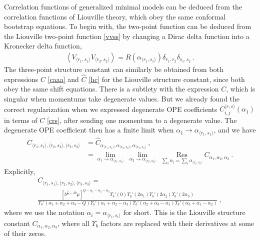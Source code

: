 \documentclass[12pt, a4paper, notitlepage, twoside]{report}
\numberwithin{equation}{section}
\theoremstyle{break}
\begin{document}
Correlation functions of generalized minimal models can be deduced from the correlation functions of Liouville theory, which obey the same conformal bootstrap equations.
To begin with, the two-point function can be deduced from the Liouville two-point function \eqref{vvss} by changing a Dirac delta function into a Kronecker delta function, 
\begin{align}
 \boxed{\left\langle V_{\langle r_1,s_1 \rangle} V_{\langle r_2,s_2 \rangle} \right\rangle = R(\alpha_{\langle r_1,s_1 \rangle}) \delta_{r_1,r_2} \delta_{s_1,s_2}}\ .
\label{vvdd}
\end{align}
The three-point structure constant can similarly be obtained from both expressions $C$ \eqref{caaa} and $\hat C$ \eqref{hc} for the Liouville structure constant, since both obey the same shift equations. 
There is a subtlety with the expression $C$, which is singular when momentums take degenerate values. 
But we already found the correct regularization when we expressed degenerate OPE coefficients $C_{i,j}^{\langle r,s \rangle}(\alpha_1)$ in terms of $C$ \eqref{crs}, after sending one momentum to a degenerate value. 
The degenerate OPE coefficient then has a finite limit when $\alpha_1\to \alpha_{\langle r_1,s_1 \rangle}$, and we have
\begin{align}
 C_{\langle r_1,s_1\rangle ,\langle r_2,s_2\rangle ,\langle r_3,s_3 \rangle} 
 &= \hat{C}_{\alpha_{\langle r_1,s_1 \rangle}, \alpha_{\langle r_2,s_2 \rangle} ,\alpha_{\langle r_3,s_3 \rangle} } \ ,
 \nonumber
 \\
& = \underset{\alpha_1\to \alpha_{\langle r_1,s_1 \rangle}}{\lim}\ 
\underset{\alpha_2\to \alpha_{\langle r_2,s_2 \rangle}}{\lim}\ 
\underset{\sum_i \alpha_i = \sum_i \alpha_{\langle r_i,s_i \rangle} }{\operatorname{ Res}} C_{\alpha_1,\alpha_2,\alpha_3}\ .
\label{chclc}
\end{align}
Explicitly,
\begin{multline}
C_{\langle r_1,s_1\rangle ,\langle r_2,s_2\rangle ,\langle r_3,s_3 \rangle} =  
\\
\frac{\left[b^{\frac{2}{b}-2b}\mu\right]^{Q-\alpha_1-\alpha_2-\alpha_3}\Upsilon_b'(0) \Upsilon_b'(2\alpha_1) \Upsilon_b'(2\alpha_2) \Upsilon_b'(2\alpha_3)}{\Upsilon_b'(\alpha_1+\alpha_2+\alpha_3-Q) \Upsilon_b'(\alpha_1+\alpha_2-\alpha_3)\Upsilon_b'(\alpha_2+\alpha_3-\alpha_1)\Upsilon_b'(\alpha_3+\alpha_1-\alpha_2)}\ ,
\label{crisi}
\end{multline}
where we use the notation $\alpha_i = \alpha_{\langle r_i,s_i \rangle}$ for short.
This is the Liouville structure constant $C_{\alpha_1,\alpha_2,\alpha_3}$, where all $\Upsilon_b$ factors are replaced with their derivatives at some of their zeros.
\end{document}
